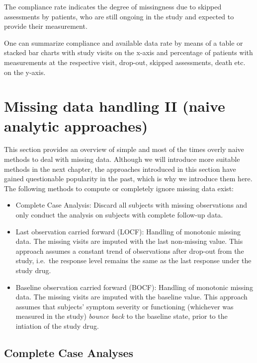 \documentclass[
  letterpaper,
  DIV=11,
  numbers=noendperiod]{scrreprt}
\begin{document}
The compliance rate indicates the degree of missingness due to skipped
assessments by patients, who are still ongoing in the study and expected
to provide their measurement.

One can summarize compliance and available data rate by means of a table
or stacked bar charts with study visits on the x-axis and percentage of
patients with measurements at the respective visit, drop-out, skipped
assessments, death etc. on the y-axis.

\hypertarget{missing-data-handling-ii-naive-analytic-approaches}{%
\section{Missing data handling II (naive analytic
approaches)}\label{missing-data-handling-ii-naive-analytic-approaches}}

This section provides an overview of simple and most of the times overly
naive methods to deal with missing data. Although we will introduce more
suitable methods in the next chapter, the approaches introduced in this
section have gained questionable popularity in the past, which is why we
introduce them here. The following methods to compute or completely
ignore missing data exist:

\begin{itemize}
\item
  Complete Case Analysis: Discard all subjects with missing observations
  and only conduct the analysis on subjects with complete follow-up
  data.
\item
  Last observation carried forward (LOCF): Handling of monotonic missing
  data. The missing visits are imputed with the last non-missing value.
  This approach assumes a constant trend of observations after drop-out
  from the study, i.e.~the response level remains the same as the last
  response under the study drug.
\item
  Baseline observation carried forward (BOCF): Handling of monotonic
  missing data. The missing visits are imputed with the baseline value.
  This approach assumes that subjects' symptom severity or functioning
  (whichever was measured in the study) \emph{bounce back} to the
  baseline state, prior to the intiation of the study drug.
\end{itemize}

\hypertarget{complete-case-analyses}{%
\subsection{Complete Case Analyses}\label{complete-case-analyses}}
\end{document}
